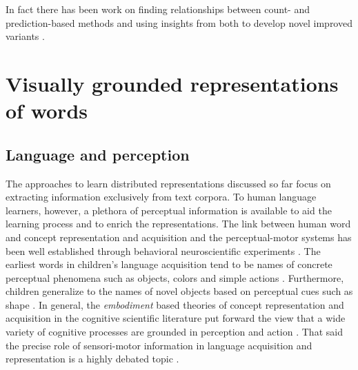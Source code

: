 In fact there has been work on finding relationships between
count- and prediction-based methods \citep{levy2014neural} and
using insights from both to develop novel improved
variants \citep{levy2015improving}.





\section{Visually grounded representations of words}
\label{sec:visualwords}

\subsection{Language and perception}
\label{sec:langperc}

The approaches to learn distributed representations discussed so far focus on extracting information exclusively
from text corpora. To human language learners, however, a plethora of perceptual information is available to aid the
learning process and to enrich the representations. The link between human word and concept representation
and acquisition and the perceptual-motor systems has been well established through behavioral
neuroscientific experiments \citep{pulvermuller2005brain}.
The earliest words in children's language acquisition tend to be names of concrete perceptual phenomena
such as objects, colors and simple actions \citep{bornstein2004cross}. Furthermore, children generalize to
the names of novel objects based on perceptual cues such as shape \citep{landau1998object}.
In general, the \emph{embodiment} based theories of concept representation and acquisition in the
cognitive scientific literature put forward the view that a wide variety of cognitive processes
are grounded in perception and action \citep{meteyard2008role}. That said the precise role of
sensori-motor information in language acquisition and representation is a highly
debated topic \citep{meteyard2012coming}.

